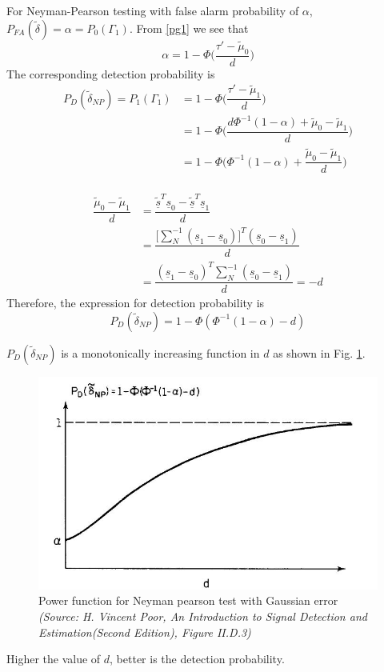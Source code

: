 \documentclass[a4paper,english,12pt]{article}
\begin{document}
\begin{exmp}
For Neyman-Pearson testing with false alarm probability of $\alpha$, 
$P_{FA}(\tilde{\delta})=\alpha = P_0(\Gamma_1)$. From \eqref{pg1} we see that
\begin{equation}
\alpha = 1- \Phi \Big( \dfrac{\tau'-\tilde{\mu}_0}{d} \Big)
\end{equation} 
The corresponding detection probability is 
\begin{align*}
P_D (\tilde{\delta}_{NP}) =P_1(\Gamma_1) &= 1- \Phi \Big( \dfrac{\tau'-\tilde{\mu}_1}{d} \Big) \\
&= 1-\Phi \Big( \dfrac{d\Phi^{-1}(1-\alpha) + \tilde{\mu}_0 - \tilde{\mu}_1}{d} \Big) \\
&=1-\Phi\Big( \Phi^{-1}(1-\alpha) + \dfrac{\tilde{\mu}_0 - \tilde{\mu}_1}{d} \Big) \\
\end{align*}

\begin{align*}
\dfrac{\tilde{\mu}_0 - \tilde{\mu}_1}{d} &= \dfrac{\tilde{\underline{s}}^T\underline{s}_0 - \tilde{\underline{s}}^T\underline{s}_1}{d} \\
&=\dfrac{\Big[ \sum\nolimits_N^{-1} (\underline{s}_1-\underline{s}_0) \Big]^T(\underline{s}_0-\underline{s}_1)}{d} \\
&= \dfrac{(\underline{s}_1 - \underline{s}_0)^T \sum\nolimits_N^{-1} (\underline{s}_0 - \underline{s}_1)}{d} = -d
\end{align*}
Therefore, the expression for detection probability is
\begin{equation}
P_D(\tilde{\delta}_{NP})=1-\Phi (\Phi ^{-1} (1-\alpha) - d)
\end{equation}

\end{exmp}
\begin{note}
$P_D(\tilde{\delta}_{NP})$ is a monotonically increasing function in $d$ as shown in Fig. \ref{pNP}.
\begin{figure}[hbtp]
\centering
\includegraphics[scale=0.75]{Figures/pd.jpeg}
\caption{Power function for Neyman pearson test with Gaussian error \\ \textit{(Source: H. Vincent Poor, An Introduction to Signal Detection and Estimation(Second
Edition), Figure II.D.3)}}
\label{pNP}
\end{figure}
Higher the value of $d$, better is the detection probability.
\end{note}
\end{document}
